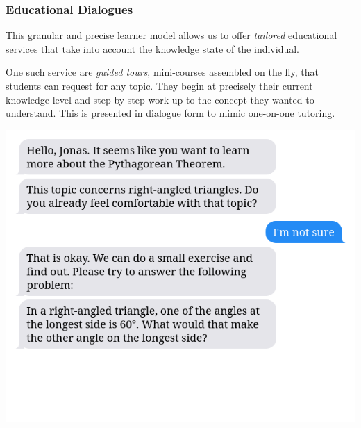 \documentclass[aspectratio=169, usenames, dvipsnames]{beamer}
\begin{document}
\begin{frame}
\frametitle{Educational Dialogues}
\begin{minipage}{0.45\textwidth}
This granular and precise learner model allows us to offer \emph{tailored}
educational services that take into account the knowledge state of the individual.
\bigskip

One such service are \emph{guided tours}, mini-courses assembled on the fly, that students can request for any topic. They begin at precisely their current knowledge level and step-by-step work up to the concept they wanted to understand. This is presented in dialogue form to mimic one-on-one tutoring.
\end{minipage}%
\hfill
\begin{minipage}{0.5\textwidth}
\includegraphics[height=0.75\textheight,keepaspectratio]{images/bubbles_example_step3} 
\end{minipage}%
\end{frame}
\end{document}
